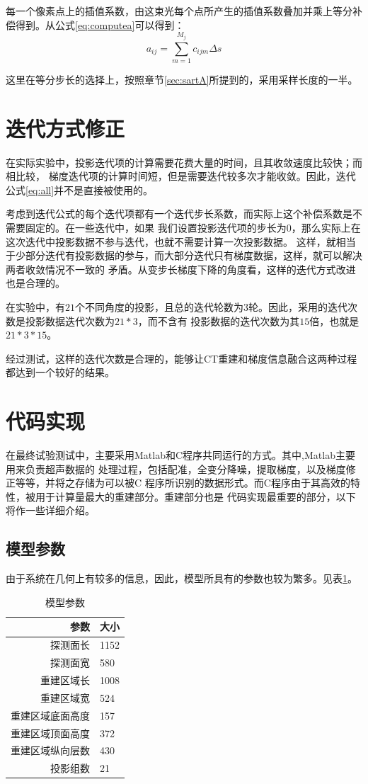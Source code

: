 每一个像素点上的插值系数，由这束光每个点所产生的插值系数叠加并乘上等分补偿得到。从公式\eqref{eq:computea}可以得到：
\begin{equation}\label{eq:computea}
a_{ij}=\sum^{M_j}_{m=1}c_{ijm}\Delta s
\end{equation}

这里在等分步长的选择上，按照章节\ref{sec:sartA}所提到的，采用采样长度的一半。

\section{迭代方式修正}
在实际实验中，投影迭代项的计算需要花费大量的时间，且其收敛速度比较快；而相比较，
梯度迭代项的计算时间短，但是需要迭代较多次才能收敛。因此，迭代公式\eqref{eq:all}并不是直接被使用的。

考虑到迭代公式的每个迭代项都有一个迭代步长系数，而实际上这个补偿系数是不需要固定的。在一些迭代中，如果
我们设置投影迭代项的步长为$0$，那么实际上在这次迭代中投影数据不参与迭代，也就不需要计算一次投影数据。
这样，就相当于少部分迭代有投影数据的参与，而大部分迭代只有梯度数据，这样，就可以解决两者收敛情况不一致的
矛盾。从变步长梯度下降的角度看，这样的迭代方式改进也是合理的。

在实验中，有$21$个不同角度的投影，且总的迭代轮数为$3$轮。因此，采用的迭代次数是投影数据迭代次数为$21*3$，而不含有
投影数据的迭代次数为其$15$倍，也就是$21*3*15$。

经过测试，这样的迭代次数是合理的，能够让CT重建和梯度信息融合这两种过程都达到一个较好的结果。

\section{代码实现}
在最终试验测试中，主要采用Matlab和C程序共同运行的方式。其中,Matlab主要用来负责超声数据的
处理过程，包括配准，全变分降噪，提取梯度，以及梯度修正等等，并将之存储为可以被C
程序所识别的数据形式。而C程序由于其高效的特性，被用于计算量最大的重建部分。重建部分也是
代码实现最重要的部分，以下将作一些详细介绍。

\subsection{模型参数}
由于系统在几何上有较多的信息，因此，模型所具有的参数也较为繁多。见表\ref{tab:para}。
\begin{table}[!h]\label{tab:para}
\center
\caption{模型参数}
\vspace{1pc}
\begin{tabular}{r|l}
\hline
参数        &     大小\\
\hline
探测面长     &   1152   \\
\hline
探测面宽    &     580 \\
\hline  
重建区域长   &   1008 \\
\hline 
重建区域宽  &  524 \\
\hline   
重建区域底面高度  &   157  \\
\hline
重建区域顶面高度  &   372   \\
\hline 
重建区域纵向层数  &  430   \\
\hline
投影组数       &  21 \\
\hline
\end{tabular}
\end{table}
